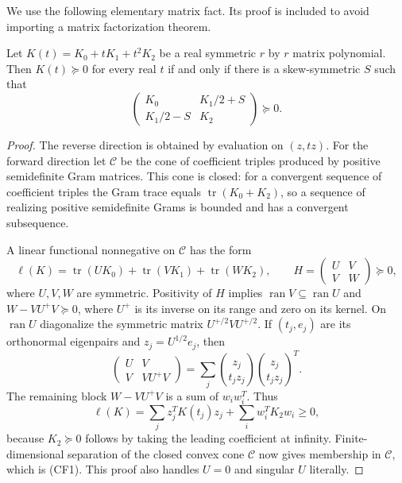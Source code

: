 We use the following elementary matrix fact. Its proof is included to
avoid importing a matrix factorization theorem.

\begin{lemma}
\label{pd9a6195f0af3:lem:quadratic-matrix-lift}
Let $K(t)=K_0+tK_1+t^2K_2$ be a real symmetric $r$ by $r$ matrix
polynomial. Then $K(t)\succeq0$ for every real $t$ if and only if
there is a skew-symmetric $S$ such that
\[
 \begin{pmatrix}
 K_0&K_1/2+S\\ K_1/2-S&K_2
 \end{pmatrix}\succeq0.                         \tag{CF1}
\]
\end{lemma}
\begin{proof}
The reverse direction is obtained by evaluation on $(z,tz)$.
For the forward direction let $\mathcal C$ be the cone of coefficient
triples produced by positive semidefinite Gram matrices. This cone is
closed: for a convergent sequence of coefficient triples the Gram
trace equals $\operatorname{tr}(K_0+K_2)$, so a sequence of realizing
positive semidefinite Grams is bounded and has a convergent subsequence.

A linear functional nonnegative on $\mathcal C$ has the form
\[
 \ell(K)=\operatorname{tr}(U K_0)+\operatorname{tr}(V K_1)
                         +\operatorname{tr}(W K_2),\qquad
 H=\begin{pmatrix}U&V\\V&W\end{pmatrix}\succeq0,
                                                        \tag{CF2}
\]
where $U,V,W$ are symmetric. Positivity of $H$ implies
$\operatorname{ran}V\subseteq\operatorname{ran}U$ and
$W-VU^+V\succeq0$, where $U^+$ is its inverse on its range and
zero on its kernel. On $\operatorname{ran}U$ diagonalize the symmetric
matrix $U^{+/2}VU^{+/2}$. If $(t_j,e_j)$ are its orthonormal
eigenpairs and $z_j=U^{1/2}e_j$, then
\[
 \begin{pmatrix}U&V\\V&VU^+V\end{pmatrix}
   =\sum_j\binom{z_j}{t_jz_j}\binom{z_j}{t_jz_j}^{\!T}.       \tag{CF3}
\]
The remaining block $W-VU^+V$ is a sum of $w_iw_i^T$. Thus
\[
 \ell(K)=\sum_j z_j^TK(t_j)z_j+\sum_iw_i^TK_2w_i\ge0,
\]
because $K_2\succeq0$ follows by taking the leading coefficient at
infinity. Finite-dimensional separation of the closed convex cone
$\mathcal C$ now gives membership in $\mathcal C$, which is (CF1).
This proof also handles $U=0$ and singular $U$ literally.
\end{proof}

